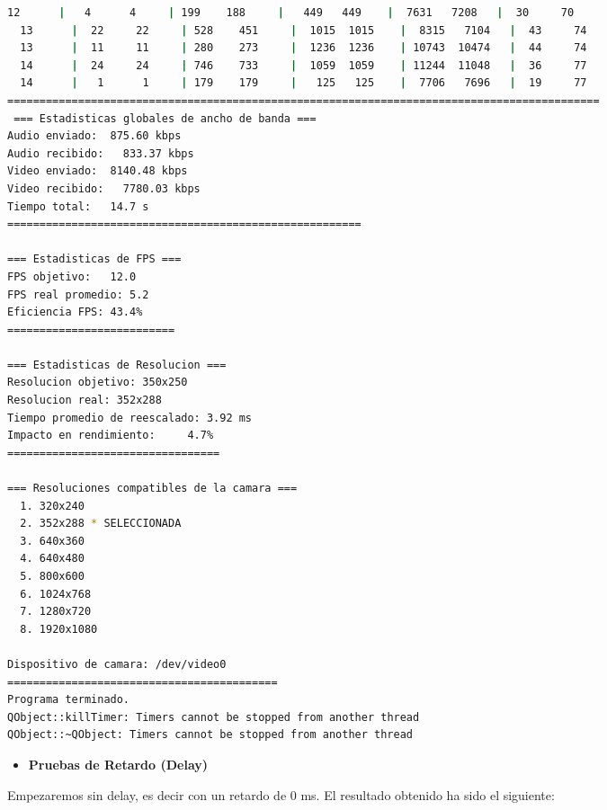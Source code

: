 \begin{adjustbox}{max width=\textwidth}
\begin{lstlisting}[language=bash,basicstyle=\ttfamily\scriptsize]
  12      |   4      4     | 199    188     |   449   449    |  7631   7208   |  30     70
  13      |  22     22     | 528    451     |  1015  1015    |  8315   7104   |  43     74
  13      |  11     11     | 280    273     |  1236  1236    | 10743  10474   |  44     74
  14      |  24     24     | 746    733     |  1059  1059    | 11244  11048   |  36     77
  14      |   1      1     | 179    179     |   125   125    |  7706   7696   |  19     77
============================================================================================
 === Estadisticas globales de ancho de banda ===
Audio enviado:	875.60 kbps
Audio recibido:   833.37 kbps
Video enviado:	8140.48 kbps
Video recibido:   7780.03 kbps
Tiempo total: 	14.7 s
=======================================================

=== Estadisticas de FPS ===
FPS objetivo: 	12.0
FPS real promedio: 5.2
Eficiencia FPS:	43.4%
==========================

=== Estadisticas de Resolucion ===
Resolucion objetivo: 350x250
Resolucion real: 352x288
Tiempo promedio de reescalado: 3.92 ms
Impacto en rendimiento:    	4.7%
=================================

=== Resoluciones compatibles de la camara ===
  1. 320x240
  2. 352x288 * SELECCIONADA
  3. 640x360
  4. 640x480
  5. 800x600
  6. 1024x768
  7. 1280x720
  8. 1920x1080

Dispositivo de camara: /dev/video0
==========================================
Programa terminado.
QObject::killTimer: Timers cannot be stopped from another thread
QObject::~QObject: Timers cannot be stopped from another thread
\end{lstlisting}
\end{adjustbox}
\vspace{\baselineskip}

\newpage

\begin{itemize}
    \item \textbf{Pruebas de Retardo (Delay)}
\end{itemize}

Empezaremos sin delay, es decir con un retardo de 0 ms. El resultado obtenido ha sido el siguiente:
\vspace{\baselineskip}

